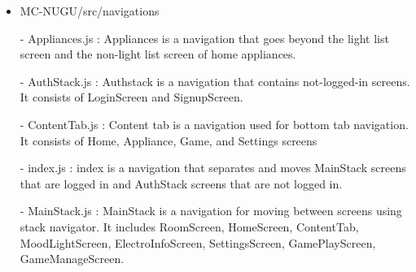 \documentclass[conference]{IEEEtran}
\begin{document}
\begin{itemize}
                \item MC-NUGU/src/navigations
                    \item[-] Appliances.js : Appliances is a navigation that goes beyond the light list screen and the non-light list screen of home appliances.
                    \item[-] AuthStack.js : Authstack is a navigation that contains not-logged-in screens. It consists of LoginScreen and SignupScreen.
                    \item[-] ContentTab.js : Content tab is a navigation used for bottom tab navigation. It consists of Home, Appliance, Game, and Settings screens
                    \item[-] index.js : index is a navigation that separates and moves MainStack screens that are logged in and AuthStack screens that are not logged in.
                    \item[-] MainStack.js : MainStack is a navigation for moving between screens using stack navigator. It includes RoomScreen, HomeScreen, ContentTab, MoodLightScreen, ElectroInfoScreen, SettingsScreen, GamePlayScreen, GameManageScreen.
                \vspace{3mm}
                

\end{itemize}
\end{document}

